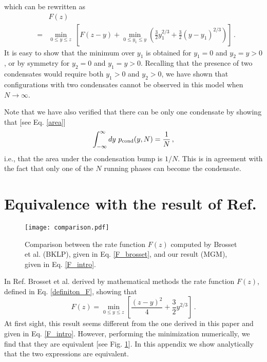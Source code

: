 \documentclass[aps,pre,twocolumn,superscriptaddress,showpacs]{revtex4-1}
\begin{document}
which can be rewritten as
\begin{eqnarray}
&&F(z)\\
&=&\min_{0\leq y\leq z}~
\left[F(z-y)+\min_{0\leq y_1\leq y} \left(\frac32 y_1^{2/3}+\frac32 (y-y_1)^{2/3}\right)\right]\,.\nonumber
\end{eqnarray}
It is easy to show that the minimum over $y_1$ is obtained for $y_1=0$ and $y_2=y>0$, or by symmetry for $y_2=0$ and $y_1=y>0$. Recalling that the presence of two condensates would require both $y_1>0$ and $y_2>0$, we have shown that configurations with two condensates cannot be observed in this model when $N\to \infty$.


Note that we have also verified that there can be only one condensate by showing that [see Eq. \eqref{area}]
\begin{equation}
\int_{-\infty}^{\infty}dy~p_{\rm cond}(y,N)=\frac{1}{N}\,,
\end{equation}
i.e., that the area under the condensation bump is $1/N$. This is in agreement with the fact that only one of the $N$ running phases can become the condensate.

\section{Equivalence with the result of Ref. \cite{BKL20}}
\label{app:equivalence}



\begin{figure}
\texttt{[image: comparison.pdf]}
\caption{Comparison between the rate function $F(z)$ computed by Brosset et al. (BKLP), given in Eq. \eqref{F_brosset}, and our result (MGM), given in Eq. \eqref{F_intro}.}
\label{fig:comparison}
\end{figure}

In Ref. \cite{BKL20} Brosset et al. derived by mathematical methods the rate function $F(z)$, defined in Eq. \eqref{definiton_F}, showing that
\begin{equation}
F(z)=\min_{0\leq y\leq z}\left[\frac{(z-y)^2}{4}+\frac{3}{2}y^{2/3}\right]\,.
\label{F_brosset}
\end{equation}
At first sight, this result seems different from the one derived in this paper and given in Eq. \eqref{F_intro}. However, performing the minimization numerically, we find that they are equivalent [see Fig. \ref{fig:comparison}]. In this appendix we show analytically that the two expressions are equivalent. 
\end{document}
